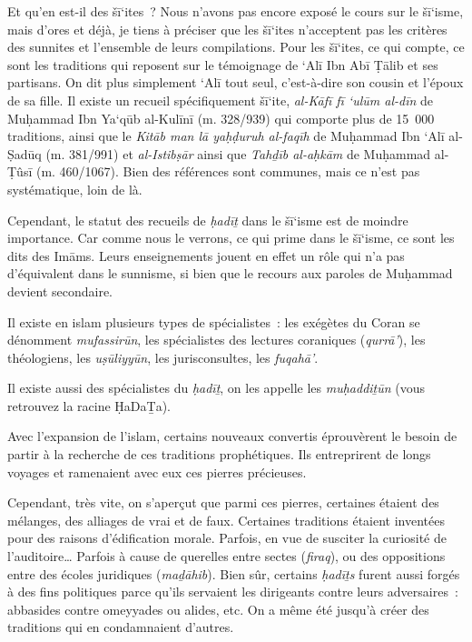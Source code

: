 Et qu'en est-il des šī`ites~? Nous n'avons pas encore exposé le cours
sur le šī`isme, mais d'ores et déjà, je tiens à préciser que les šī`ites
n'acceptent pas les critères des sunnites et l'ensemble de leurs
compilations. Pour les šī`ites, ce qui compte, ce sont les traditions
qui reposent sur le témoignage de `Alī Ibn Abī Ṭālib et ses partisans.
On dit plus simplement `Alī tout seul, c'est-à-dire son cousin et
l'époux de sa fille. Il existe un recueil spécifiquement šī`ite,
\emph{al-Kāfī fī `ulūm al-dīn} de Muḥammad Ibn Ya`qūb al-Kulīnī (m.
328/939) qui comporte plus de 15~000 traditions, ainsi que le
\emph{Kitāb man lā yaḥḍuruh al-faqīh} de Muḥammad Ibn `Alī al-Ṣadūq (m.
381/991) et \emph{al-Istibṣār} ainsi que \emph{Tahḏīb al-aḥkām} de
Muḥammad al-Ṭûsī (m. 460/1067). Bien des références sont communes, mais
ce n'est pas systématique, loin de là.

Cependant, le statut des recueils de \emph{ḥadīṯ} dans le šī`isme est de
moindre importance. Car comme nous le verrons, ce qui prime dans le
šī`isme, ce sont les dits des Imāms. Leurs enseignements jouent en effet
un rôle qui n'a pas d'équivalent dans le sunnisme, si bien que le
recours aux paroles de Muḥammad devient secondaire.


Il existe en islam plusieurs types de spécialistes~: les exégètes du
Coran se dénomment \emph{mufassirūn}, les spécialistes des lectures
coraniques (\emph{qurrā'}), les théologiens, les \emph{uṣūliyyūn}, les
jurisconsultes, les \emph{fuqahā'}. 
\begin{Def}[muḥaddiṯūn]
Il existe aussi des spécialistes du
\emph{ḥadīṯ}, on les appelle les \emph{muḥaddiṯūn} (vous retrouvez la
racine ḤaDaṮa).
\end{Def}
 Avec l'expansion de l'islam, certains nouveaux convertis
éprouvèrent le besoin de partir à la recherche de ces traditions
prophétiques. Ils entreprirent de longs voyages et ramenaient avec eux
ces pierres précieuses.

Cependant, très vite, on s'aperçut que parmi ces pierres, certaines
étaient des mélanges, des alliages de vrai et de faux. Certaines
traditions étaient inventées pour des raisons d'édification morale.
Parfois, en vue de susciter la curiosité de l'auditoire\ldots{} Parfois
à cause de querelles entre sectes (\emph{firaq}), ou des oppositions
entre des écoles juridiques (\emph{maḏāhib}). Bien sûr, certains
\emph{ḥadīṯs} furent aussi forgés à des fins politiques parce qu'ils
servaient les dirigeants contre leurs adversaires~: abbasides contre
omeyyades ou alides, etc. On a même été jusqu'à créer des traditions qui
en condamnaient d'autres.

